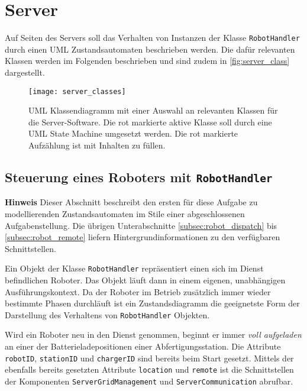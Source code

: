 
\section{Server}
\label{sec:server}

Auf Seiten des Servers soll das Verhalten von Instanzen der Klasse \texttt{RobotHandler} durch einen UML Zustandsautomaten beschrieben werden. 
Die dafür relevanten Klassen werden im Folgenden beschrieben und sind zudem in \autoref{fig:server_class} dargestellt.

\begin{figure}[t]
	\centering
	\texttt{[image: server\_classes]}
	\caption{UML Klassendiagramm mit einer Auswahl an relevanten Klassen für die Server-Software. Die rot markierte aktive Klasse soll durch eine UML State Machine umgesetzt werden. Die rot markierte Aufzählung ist mit Inhalten zu füllen.}
	\label{fig:server_class}
\end{figure}


\subsection{Steuerung eines Roboters mit \texttt{RobotHandler}}
\label{subsec:server_roborhandler}

{\color{hpired} \textbf{Hinweis} Dieser Abschnitt beschreibt den ersten für diese Aufgabe zu modellierenden Zustandsautomaten im Stile einer abgeschlossenen Aufgabenstellung. Die übrigen Unterabschnitte \ref{subsec:robot_dispatch} bis \ref{subsec:robot_remote} liefern Hintergrundinformationen zu den verfügbaren Schnittstellen.}

Ein Objekt der Klasse \texttt{RobotHandler} repräsentiert einen sich im Dienst befindlichen Roboter. Das Objekt läuft dann in einem eigenen, unabhängigen Ausführungskontext. Da der Roboter im Betrieb zusätzlich immer wieder bestimmte Phasen durchläuft ist ein Zustandsdiagramm die geeignetste Form der Darstellung des Verhaltens von \texttt{RobotHandler} Objekten.

Wird ein Roboter neu in den Dienst genommen, beginnt er immer \emph{voll aufgeladen} an einer der Batterieladepositionen einer Abfertigungsstation.
Die Attribute \texttt{robotID}, \texttt{stationID} und \texttt{chargerID} sind bereits beim Start gesetzt.
Mittels der ebenfalls bereits gesetzten Attribute \texttt{location} und \texttt{remote} ist die Schnittstellen der Komponenten \texttt{ServerGridManagement} und \texttt{ServerCommunication} abrufbar.

